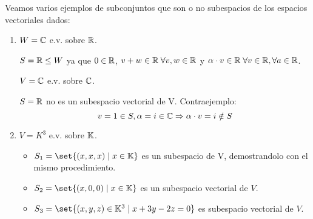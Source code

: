 \begin{example}
	Veamos varios ejemplos de subconjuntos que son o no subespacios de los espacios vectoriales dados:
	\begin{enumerate}
		\item \(W = \mathbb{C} \) e.v. sobre \(\mathbb{R} \).

		      \(S = \mathbb{R} \leq W \) ya que \(0 \in \mathbb{R} \), \(v + w \in \mathbb{R} \; \forall v,w \in \mathbb{R} \) y \(\alpha \cdot v \in \mathbb{R} \; \forall v \in \mathbb{R}, \forall a \in \mathbb{R} \).

		      \(V = \mathbb{C} \) e.v. sobre \(\mathbb{C} \).

		      \(S = \mathbb{R} \) no es un subespacio vectorial de V. Contraejemplo:
		      \[
			      v = 1 \in S, \alpha = i \in \mathbb{C} \Rightarrow \alpha \cdot v = i \notin S
		      \]

		\item \(V = K^{3 } \) e.v. sobre \(\mathbb{K} \).

		      \begin{itemize}
			      \item \(S_1 = \set{(x,x,x) \mid x \in \K }\) es un subespacio de V, demostrandolo con el mismo procedimiento.
			      \item \(S_2 = \set{(x,0,0) \mid x \in \K}\) es un subespacio vectorial de \(V \).
			      \item \(S_3 = \set{(x,y,z) \in \K^{3} \mid x + 3y - 2z = 0}\) es subespacio vectorial de \(V \).


\end{itemize}
\end{enumerate}
\end{example}
